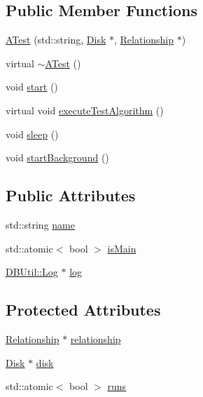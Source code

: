 \subsection*{Public Member Functions}
\begin{DoxyCompactItemize}
\item 
\hyperlink{class_h_d_d_test_1_1_a_test_af07238e3cb280500d2c32968bd798b3b}{A\-Test} (std\-::string, \hyperlink{class_h_d_d_test_1_1_disk}{Disk} $\ast$, \hyperlink{class_h_d_d_test_1_1_relationship}{Relationship} $\ast$)
\item 
virtual \hyperlink{class_h_d_d_test_1_1_a_test_ac3b7b3b7fa2da5fa4c8b13bd95f46859}{$\sim$\-A\-Test} ()
\item 
void \hyperlink{class_h_d_d_test_1_1_a_test_a3c3ae1353dc05321bafa921ff6de4342}{start} ()
\item 
virtual void \hyperlink{class_h_d_d_test_1_1_a_test_a7dc054e211eccf42c03a6bb31d7fdc6e}{execute\-Test\-Algorithm} ()
\item 
void \hyperlink{class_h_d_d_test_1_1_a_test_a34afdf1fdbea73fd11422392eeb88320}{sleep} ()
\item 
void \hyperlink{class_h_d_d_test_1_1_a_test_ad4846b9edaba08c50795e0cb3f61c7cb}{start\-Background} ()
\end{DoxyCompactItemize}
\subsection*{Public Attributes}
\begin{DoxyCompactItemize}
\item 
std\-::string \hyperlink{class_h_d_d_test_1_1_a_test_aa7570476c8072fbbf8ec24c8f997656f}{name}
\item 
std\-::atomic$<$ bool $>$ \hyperlink{class_h_d_d_test_1_1_a_test_ac32f948a2541934bba8137e20987bf71}{is\-Main}
\item 
\hyperlink{class_d_b_util_1_1_log}{D\-B\-Util\-::\-Log} $\ast$ \hyperlink{class_h_d_d_test_1_1_a_test_a5db6314a0231c885e25a9c98ea41e95a}{log}
\end{DoxyCompactItemize}
\subsection*{Protected Attributes}
\begin{DoxyCompactItemize}
\item 
\hyperlink{class_h_d_d_test_1_1_relationship}{Relationship} $\ast$ \hyperlink{class_h_d_d_test_1_1_a_test_a2c3b0b7b9ec6c37f8dce5cceba4b728e}{relationship}
\item 
\hyperlink{class_h_d_d_test_1_1_disk}{Disk} $\ast$ \hyperlink{class_h_d_d_test_1_1_a_test_a8299c80c0778b70fabcc8af49e3f0334}{disk}
\item 
std\-::atomic$<$ bool $>$ \hyperlink{class_h_d_d_test_1_1_a_test_a3b5cdf4b9fef9a7c74ec02755a08df24}{runs}
\end{DoxyCompactItemize}


